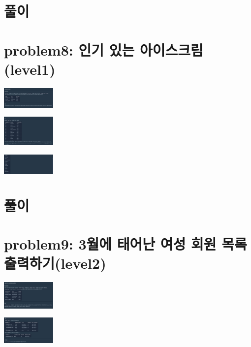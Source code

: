 \documentclass[11pt]{article}
\begin{document}
\section*{풀이}
\label{sec:orgbffdccd}

\section*{problem8: 인기 있는 아이스크림(level1)}
\label{sec:orged1c410}
\begin{center}
\includegraphics[width=100px]{../static/img/sql/p8-1.png}
\end{center}
\begin{center}
\includegraphics[width=100px]{../static/img/sql/p8-2.png}
\end{center}
\begin{center}
\includegraphics[width=100px]{../static/img/sql/p8-3.png}
\end{center}

\section*{풀이}
\label{sec:orgcacdc94}

\section*{problem9: 3월에 태어난 여성 회원 목록 출력하기(level2)}
\label{sec:org3257e52}
\begin{center}
\includegraphics[width=100px]{../static/img/sql/p9-1.png}
\end{center}
\begin{center}
\includegraphics[width=100px]{../static/img/sql/p9-2.png}
\end{center}
\end{document}
